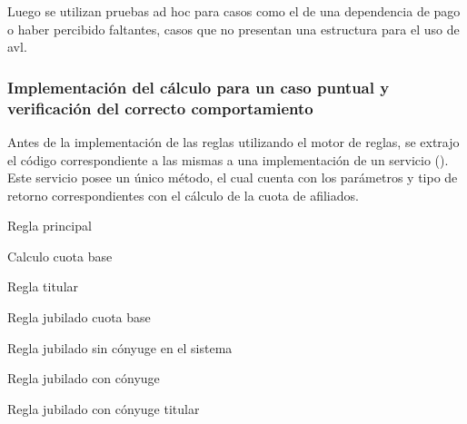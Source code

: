 Luego se utilizan pruebas ad hoc para casos como el de una dependencia de pago o haber percibido faltantes, casos que no presentan una estructura para el uso de \acrshort{avl}.

\subsubsection{Implementación del cálculo para un caso puntual y verificación del correcto comportamiento}
Antes de la implementación de las reglas utilizando el motor de reglas, se extrajo el código correspondiente a las mismas a una implementación de un servicio (). Este servicio posee un único método, el cual cuenta con los parámetros y tipo de retorno correspondientes con el cálculo de la cuota de afiliados.

\begin{table}[!h]
    \label{tab:regla_principal}
    \centering
    
    \caption{Regla principal}
\end{table}

\begin{table}[!h]
    \label{tab:regla_base}
    \centering
    
    \caption{Calculo cuota base}
\end{table}

\begin{table}[!h]
    \label{tab:regla_titular}
    \centering
    
    \caption{Regla titular}
\end{table}

\begin{table}[!h]
    \label{tab:regla_jubilado}
    \centering
    
    \caption{Regla jubilado cuota base}
\end{table}

\begin{table}[!h]
    \label{tab:regla_sin_conyuge}
    \centering
    
    \caption{Regla jubilado sin cónyuge en el sistema} 
\end{table}

\begin{table}[!h]
    \label{tab:regla_conyuge}
    \centering
    
    \caption{Regla jubilado con cónyuge}
\end{table}

\begin{table}[!h]
    \label{tab:regla_conyuge_titular}
    \centering
    
    \caption{Regla jubilado con cónyuge titular}
\end{table}

